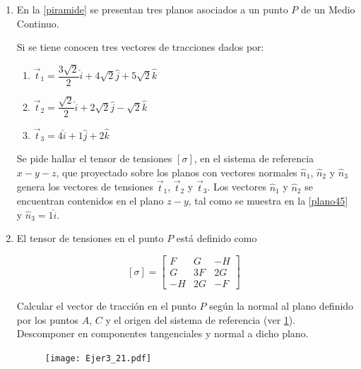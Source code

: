 \documentclass[../notas medios.tex]{subfiles}
\begin{document}
\begin{enumerate}
\begin{enumerate}
\end{enumerate} 
%
\item \label{punto20} En la \cref{piramide} se presentan tres planos asociados a un punto $P$ de un Medio Continuo.
%
\begin{figure}[H]
	\centering
		\hspace{2.0cm}
	\caption{ }
\end{figure}
%
Si se tiene conocen tres vectores de tracciones dados por: 
%
\begin{enumerate}
%
\item $\overset{\rightarrow} t _{1}= \dfrac{3 \sqrt{2}}{2} \hat{i} + 4 \sqrt{2} \hat{j} + 5 \sqrt{2} \hat{k}$
\item $\overset{\rightarrow} t _{2}= \dfrac{\sqrt{2}}{2} \hat{i} + 2 \sqrt{2} \hat{j} -  \sqrt{2} \hat{k}$
\item $\overset{\rightarrow} t _{3}= 4 \hat{i} + 1 \hat{j} + 2 \hat{k}$
%
\end{enumerate} 
%
Se pide hallar el tensor de tensiones $ \left[ \sigma \right] $, en el sistema de referencia $x-y-z$, que proyectado sobre los planos con vectores normales $\hat{n}_{1}$, $\hat{n}_{2}$ y $\hat{n}_{3}$ genera los vectores de tensiones $\overset{\rightarrow} t _{1}$, $\overset{\rightarrow} t _{2}$ y $\overset{\rightarrow} t _{3}$. Los vectores $\hat{n}_{1}$ y $\hat{n}_{2}$ se encuentran contenidos en el plano $z-y$, tal como se muestra en la \cref{plano45} y $\hat{n}_{3}=1 \hat{i}$.

\item \label{punto21} El tensor de tensiones en el punto $P$ está definido
como
%	
\begin{large}
	\[ [\sigma] = \left[ \begin{array}{ccc}
	F & G & -H \\ 
	G & 3F & 2G \\ 
	-H & 2G & -F
	\end{array}  \right] \enspace\]
\end{large}
%
Calcular el vector de tracción en el punto $P$ seg\'un la normal al plano definido por los puntos $A$, $C$ y el origen del sistema de referencia (ver \cref{vecplano}). Descomponer en componentes tangenciales y normal a dicho plano.
\begin{figure}[H]
	\centering
	\texttt{[image: Ejer3\_21.pdf]}
	\vspace{-.5 cm}
	\caption{}
	\label{vecplano}
\end{figure}


\end{enumerate}
\end{document}
